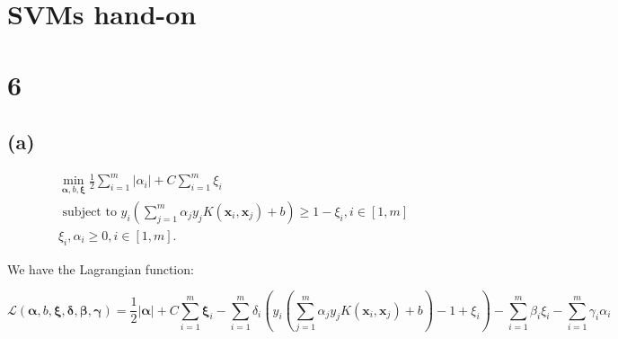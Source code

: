 \documentclass{article}
\begin{document}




\section*{SVMs hand-on}
\section*{6}
\subsection*{(a)}
\begin{equation}
    \begin{aligned}
        \min _{\boldsymbol{\alpha}, b, \boldsymbol{\xi}} \frac{1}{2} \sum_{i=1}^{m}\left|\alpha_{i}\right|+C \sum_{i=1}^{m} \xi_{i}                               \\
        \text { subject to } y_{i}\left(\sum_{j=1}^{m} \alpha_{j} y_{j} K\left(\boldsymbol{x}_{i}, \boldsymbol{x}_{j}\right)+b\right) \geq 1-\xi_{i}, i \in[1, m] \\
        \xi_{i}, \alpha_{i} \geq 0, i \in[1, m] .
    \end{aligned}
\end{equation}

We have the Lagrangian function:

\begin{equation}
    \mathcal{L}(\bm{\alpha}, b, \bm{\xi}, \bm{\delta}, \bm{\beta}, \bm{\gamma})
    = \frac{1}{2} |\bm{\alpha}|
    + C \sum_{i=1}^{m} \bm{\xi}_{i}
    - \sum_{i=1}^{m}
    \delta_{i}
    \left(
    y_{i}\left(\sum_{j=1}^{m} \alpha_{j} y_{j} K\left(\boldsymbol{x}_{i}, \boldsymbol{x}_{j}\right)+b\right) - 1 + \xi_{i}
    \right)
    - \sum_{i=1}^{m} \beta_{i} \xi_{i}
    - \sum_{i=1}^{m} \gamma_{i} \alpha_{i}
\end{equation}
\end{document}
